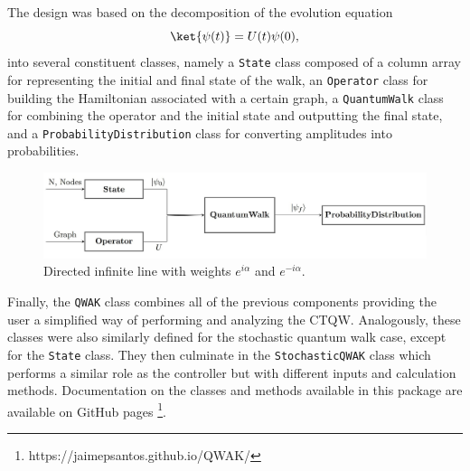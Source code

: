 \documentclass[../../dissertation.tex]{subfiles}
\begin{document}
The design was based on the decomposition of the evolution equation
\begin{equation}
    \ket{\psi(t)} = U(t) \psi(0),
\end{equation}
into several constituent classes, namely a \texttt{State} class composed of a
column array for representing the initial and final state of the walk, an
\texttt{Operator} class for building the Hamiltonian associated with a certain
graph, a \texttt{QuantumWalk} class for combining the operator and the initial
state and outputting the final state, and a \texttt{ProbabilityDistribution}
class for converting amplitudes into probabilities.\par
\begin{figure}[!h]
    \centering
    \includegraphics[width=12cm]{img/QWAK/qwakDiagram.jpg}
    \caption{Directed infinite line with weights $e^{i\alpha}$ and $e^{-i\alpha}$.}
    \label{fig:oriented_line}
\end{figure}

Finally, the \texttt{QWAK} class combines all of the previous components
providing the user a simplified way of performing and analyzing the CTQW.
Analogously, these classes were also similarly defined for the stochastic
quantum walk case, except for the \texttt{State} class. They then culminate in
the \texttt{StochasticQWAK} class which performs a similar role as the
controller but with different inputs and calculation methods. Documentation on
the classes and methods available in this package are available on GitHub pages
\footnote{https://jaimepsantos.github.io/QWAK/}. 

\end{document}
